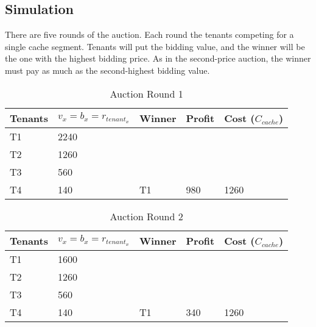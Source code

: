 \documentclass[conference]{IEEEtran}
\begin{document}
\subsection{Simulation}
There are five rounds of the auction. Each round the tenants competing for a single cache segment. Tenants will put the bidding value, and the winner will be the one with the highest bidding price. As in the second-price auction, the winner must pay as much as the second-highest bidding value. 
\begin{table}[htbp]
	\caption{Auction Round 1}
	\begin{tabular}{|l|l|l|l|l|}
		\hline
		\rowcolor[HTML]{C0C0C0} 
		Tenants& $v_x = b_x = r_{tenant_x}$ & Winner               & Profit                & Cost ($C_{cache}$)             \\ \hline
		T1          & 2240                             &                      &                       &                        \\ \cline{1-2}
		T2          & 1260                             &                      &                       &                        \\ \cline{1-2}
		T3          & 560                              &                      &                       &                        \\ \cline{1-2}
		T4          & 140                              & \multirow{-4}{*}{T1} & \multirow{-4}{*}{980} & \multirow{-4}{*}{1260} \\ \hline
	\end{tabular}
\end{table}

\begin{table}[htbp]
	\caption{Auction Round 2}
	\begin{tabular}{|l|l|l|l|l|}
		\hline
		\rowcolor[HTML]{C0C0C0} 
		Tenants& $v_x = b_x = r_{tenant_x}$ & Winner               & Profit                & Cost ($C_{cache}$)             \\ \hline
		T1          & 1600                             &                      &                       &                        \\ \cline{1-2}
		T2          & 1260                             &                      &                       &                        \\ \cline{1-2}
		T3          & 560                              &                      &                       &                        \\ \cline{1-2}
		T4          & 140                              & \multirow{-4}{*}{T1} & \multirow{-4}{*}{340} & \multirow{-4}{*}{1260} \\ \hline
	\end{tabular}
\end{table}
\end{document}
